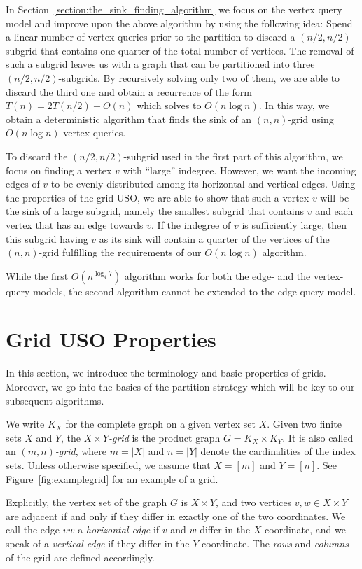 \documentclass[runningheads,a4paper]{llncs}
\begin{document}
In Section~\ref{section:the_sink_finding_algorithm} we focus on the vertex query model and improve upon the above algorithm by using the following idea: Spend a linear number of vertex queries prior to the partition to discard a $(n/2, n/2)$-subgrid that contains one quarter of the total number of vertices. 
The removal of such a subgrid leaves us with a graph that can be partitioned into three $(n/2, n/2)$-subgrids. 
By recursively solving only two of them, we are able to discard the third one and obtain a recurrence of the form $T(n) = 2 T(n/2) + O(n)$ which solves to $O(n \log n)$. 
In this way, we obtain a deterministic algorithm that finds the sink of an $(n, n)$-grid using $O(n \log n)$ vertex queries. 

To discard the $(n/2, n/2)$-subgrid used in the first part of this algorithm, we focus on finding a vertex $v$ with ``large'' indegree. 
However, we want the incoming edges of $v$ to be evenly distributed among its horizontal and vertical edges. Using the properties of the grid USO, we are able to show that such a vertex $v$ will be the sink of a large subgrid, namely the smallest subgrid that contains $v$ and each vertex that has an edge towards $v$.
If the indegree of $v$ is sufficiently large, then this subgrid having $v$ as its sink will contain a quarter of the vertices of the $(n,n)$-grid fulfilling the requirements of our $O(n \log n)$ algorithm.

While the first $O(n^{\log_4 7})$ algorithm works for both the edge- and the vertex-query models, the second algorithm cannot be extended to the edge-query model.
\section{Grid USO Properties}\label{section:grid_uso_properties}
In this section, we introduce the terminology and basic properties of grids. Moreover, we go into the basics of the partition strategy which will be key to our subsequent algorithms.

We write $K_X$ for the complete graph on a given vertex set $X$.
Given two finite sets $X$ and $Y$,
the \emph{$X \times Y$-grid} is the product graph $G = K_X \times K_Y$.
It is also called an \emph{$(m,n)$-grid}, where $m = |X|$ and $n = |Y|$ denote
the cardinalities of the index sets.
Unless otherwise specified, we assume that $X = [m]$ and $Y = [n]$.
See Figure~\ref{fig:examplegrid} for an example of a grid.

Explicitly, the vertex set of the graph $G$ is $X \times Y$, and two
vertices $v,w \in X \times Y$ are adjacent if and only if they differ in
exactly one of the two coordinates.
We call the edge $vw$ a \emph{horizontal edge} if $v$ and $w$ differ in the
$X$-coordinate, and we speak of a \emph{vertical edge} if they differ in the
$Y$-coordinate. The \emph{rows} and \emph{columns} of the grid are defined accordingly.
\end{document}
